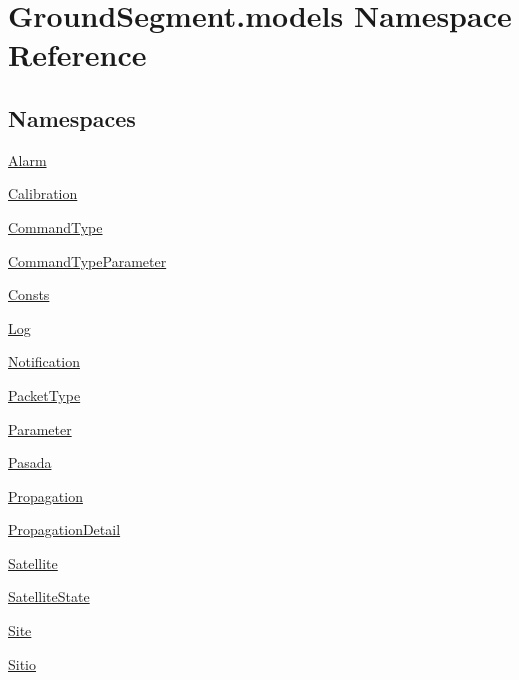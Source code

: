 \hypertarget{namespace_ground_segment_1_1models}{}\section{Ground\+Segment.\+models Namespace Reference}
\label{namespace_ground_segment_1_1models}
\subsection*{Namespaces}
\begin{DoxyCompactItemize}
\item 
 \hyperlink{namespace_ground_segment_1_1models_1_1_alarm}{Alarm}
\item 
 \hyperlink{namespace_ground_segment_1_1models_1_1_calibration}{Calibration}
\item 
 \hyperlink{namespace_ground_segment_1_1models_1_1_command_type}{Command\+Type}
\item 
 \hyperlink{namespace_ground_segment_1_1models_1_1_command_type_parameter}{Command\+Type\+Parameter}
\item 
 \hyperlink{namespace_ground_segment_1_1models_1_1_consts}{Consts}
\item 
 \hyperlink{namespace_ground_segment_1_1models_1_1_log}{Log}
\item 
 \hyperlink{namespace_ground_segment_1_1models_1_1_notification}{Notification}
\item 
 \hyperlink{namespace_ground_segment_1_1models_1_1_packet_type}{Packet\+Type}
\item 
 \hyperlink{namespace_ground_segment_1_1models_1_1_parameter}{Parameter}
\item 
 \hyperlink{namespace_ground_segment_1_1models_1_1_pasada}{Pasada}
\item 
 \hyperlink{namespace_ground_segment_1_1models_1_1_propagation}{Propagation}
\item 
 \hyperlink{namespace_ground_segment_1_1models_1_1_propagation_detail}{Propagation\+Detail}
\item 
 \hyperlink{namespace_ground_segment_1_1models_1_1_satellite}{Satellite}
\item 
 \hyperlink{namespace_ground_segment_1_1models_1_1_satellite_state}{Satellite\+State}
\item 
 \hyperlink{namespace_ground_segment_1_1models_1_1_site}{Site}
\item 
 \hyperlink{namespace_ground_segment_1_1models_1_1_sitio}{Sitio}
\item 

\end{DoxyCompactItemize}
